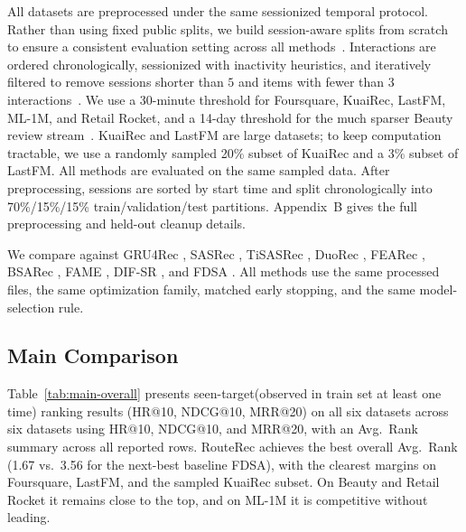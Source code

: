 \documentclass[sigconf,review,anonymous]{acmart}
\newcommand{\jm}[1]{{\color{red} #1}}
\begin{document}
\jm{All datasets are preprocessed under the same sessionized temporal protocol. Rather than using fixed public splits, we build session-aware splits from scratch to ensure a consistent evaluation setting across all methods~\cite{jannach2022sessions,quadrana2017hrnn,latifi2021sessionaware}.} Interactions are ordered chronologically, sessionized with inactivity heuristics, and iteratively filtered to remove sessions shorter than $5$ and items with fewer than $3$ interactions~\cite{li2017narm,wu2019srgnn}. We use a 30-minute threshold for Foursquare, KuaiRec, LastFM, ML-1M, and Retail Rocket, and a 14-day threshold for the much sparser Beauty review stream~\cite{quadrana2017hrnn,lacic2020jobsessions,borgbruun2022insurance}. \jm{KuaiRec and LastFM are large datasets; to keep computation tractable, we use a randomly sampled 20\% subset of KuaiRec and a 3\% subset of LastFM. All methods are evaluated on the same sampled data.} After preprocessing, sessions are sorted by start time and split chronologically into 70\%/15\%/15\% train/validation/test partitions. Appendix~B gives the full preprocessing and held-out cleanup details.

We compare against GRU4Rec \cite{hidasi2016gru4rec}, SASRec \cite{kang2018sasrec}, TiSASRec \cite{li2020tisasrec}, DuoRec \cite{qiu2022duorec}, FEARec \cite{du2023fearec}, BSARec \cite{shin2024bsarec}, FAME \cite{liu2025fame}, DIF-SR \cite{xie2022difsr}, and FDSA \cite{zhang2019fdsa}. All methods use the same processed files, the same optimization family, matched early stopping, and the same model-selection rule.

\subsection{Main Comparison}
\label{sec:overall-performance}

Table~\ref{tab:main-overall} presents \jm{seen-target(observed in train set at least one time) ranking results (HR@10, NDCG@10, MRR@20) on all six datasets} across six datasets using HR@10, NDCG@10, and MRR@20, with an Avg.~Rank summary across all reported rows. RouteRec achieves the best overall Avg.~Rank (1.67 vs.\ 3.56 for the next-best baseline FDSA), with the clearest margins on Foursquare, LastFM, and the sampled KuaiRec subset. On Beauty and Retail Rocket it remains close to the top, and on ML-1M it is competitive without leading.
\end{document}
